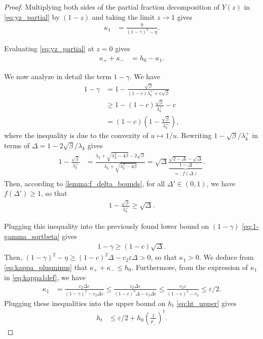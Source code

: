 \documentclass{article}
\theoremstyle{plain}
\theoremstyle{definition}
\theoremstyle{remark}
\begin{document}
\begin{proof}
  Multiplying both sides of the partial fraction decomposition of $Y(z)$ in \eqref{eq:yz_partial} by $(1-z)$ and taking the limit $z \to 1$ gives
  \begin{align}\label{eq:kappa1def}
    \kappa_1 & = \frac{\eta}{(1-\gamma)^2 - \eta}.
  \end{align}

  Evaluating \eqref{eq:yz_partial} at $z=0$ gives
  \begin{align}\label{eq:kappa_plusminus}
    \kappa_+ + \kappa_- & = h_0 - \kappa_1.
  \end{align}

  We now analyze in detail the term $1-\gamma$. We have
  \begin{align}
    1-\gamma & = 1 - \frac{\sqrt{\beta}}{(1-c)\lambda_k^+ + c\sqrt{\beta}} \nonumber\\
    & \geqslant 1 - (1-c)\frac{\sqrt{\beta}}{\lambda_k^+} - c \nonumber\\
    & = (1-c)\left(1 - \frac{\sqrt{\beta}}{\lambda_k^+}\right), \label{eq:1-gamma_sqrtbeta}
  \end{align}
  where the inequality is due to the convexity of $u\mapsto 1/u$. Rewriting $1-\sqrt{\beta}/\lambda_k^+$ in terms of $\Delta = 1 - 2\sqrt{\beta}/\lambda_k$ gives
  \begin{align}\label{eq:1_gamma_fdelta}
    1 - \frac{\sqrt{\beta}}{\lambda_k^+} & = \frac{\lambda_k + \sqrt{\lambda_k^2 - 4\beta} - 2\sqrt{\beta}}{\lambda_k + \sqrt{\lambda_k^2 - 4\beta}} = \sqrt{\Delta} \underbrace{\frac{\sqrt{2-\Delta} - \sqrt{\Delta}}{1 - \Delta}}_{=: f(\Delta)}.
  \end{align}
  Then, according to \cref{lemma:f_delta_bounds}, for all $\Delta' \in (0,1)$, we have $f(\Delta' ) \geqslant 1$, so that
  \begin{align*}
    1 - \frac{\sqrt{\beta}}{\lambda_k^+} \geqslant \sqrt{\Delta}.
  \end{align*}

  Plugging this inequality into the previously found lower bound on $(1-\gamma)$ \eqref{eq:1-gamma_sqrtbeta} gives
  \begin{align}\label{eq:1minusgamma_ineq}
    1 - \gamma \geqslant (1-c) \sqrt{\Delta}.
  \end{align}
  Then, $(1 - \gamma)^2 - \eta \geqslant (1-c)^2 \Delta - c_2 \varepsilon \Delta > 0$, so that $\kappa_1 > 0$. We deduce from \eqref{eq:kappa_plusminus} that $\kappa_+ + \kappa_- \leqslant h_0$. Furthermore, from the expression of $\kappa_1$ in \eqref{eq:kappa1def}, we have
  \begin{align*}
    \kappa_1 & = \frac{c_2 \Delta\varepsilon}{(1-\gamma)^2 - c_2 \Delta\varepsilon} \leqslant \frac{c_2 \Delta\varepsilon}{(1-c)^2 \Delta - c_2 \Delta\varepsilon} \leqslant \frac{c_2 \varepsilon}{(1 - c)^2 - c_2} \leqslant \varepsilon/2.
  \end{align*}
  Plugging these inequalities into the upper bound on $h_t$ \eqref{eq:ht_upper} gives
  \begin{align}\label{eq:ht_intermediate}
    h_t & \leqslant  \varepsilon/2 + h_0 \left(\frac{1}{\rho_-}\right)^t.
  \end{align}


\end{proof}
\end{document}
